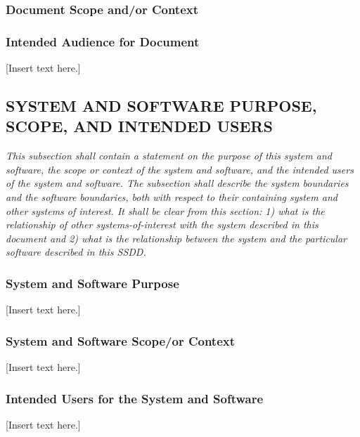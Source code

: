 \documentclass[twoside,letterpaper]{article}
\begin{document}
\subsubsection{Document Scope and/or Context}
{\color{black}

}

\subsubsection{Intended Audience for Document}
{\color{black}
[Insert text here.]}

\subsection[SYSTEM AND SOFTWARE PURPOSE, SCOPE, AND INTENDED
USERS]{\bfseries\color{black} SYSTEM AND
SOFTWARE PURPOSE, SCOPE, AND INTENDED USERS}
{\itshape\color{black}
This subsection shall contain a statement on the purpose of this system
and software, the scope or context of the system and software, and the
intended users of the system and software. The subsection shall
describe the system boundaries and the software boundaries, both with
respect to their containing system and other systems of interest. It
shall be clear from this section: 1) what is the relationship of other
systems-of-interest with the system described in this document and 2)
what is the relationship between the system and the particular software
described in this SSDD.}

\subsubsection{System and Software Purpose}
{\color{black}
[Insert text here.]}

\subsubsection[System and Software Scope/or Context]{System and Software
Scope/or Context}
{\color{black}
[Insert text here.]}

\subsubsection{Intended Users for the System and Software}
{\color{black}
[Insert text here.]}
\end{document}
